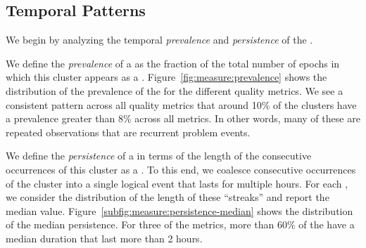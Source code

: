\subsection{Temporal Patterns}
\label{subsec:measurement:video:temporal}

We begin by analyzing the temporal \emph{prevalence} and 
\emph{persistence} of the \problemclusters.

We define the \emph{prevalence} of a \problemcluster as the 
fraction of the total number of epochs in which this cluster 
appears as a \problemcluster.  
Figure~\ref{fig:measure:prevalence} shows the distribution of 
the prevalence of the \problemclusters for the different
quality metrics. We see a consistent pattern  across all quality 
metrics that around 10\% of the clusters have a prevalence 
greater than 8\% across all metrics. 
In other words, many of these \problemclusters are repeated 
observations that are recurrent problem events. 

We define the \emph{persistence} of a \problemcluster in terms 
of the length of the consecutive occurrences of this cluster as a
\problemcluster.  
To this end, we coalesce consecutive occurrences of the cluster 
into a single logical event that lasts for multiple hours. 
For each \problemcluster, we  consider the distribution of the 
length of these ``streaks'' and report the median value.
Figure~\ref{subfig:measure:persistence-median} shows 
the distribution of the median persistence. 
For three of the metrics, more than 60\% of the \problemclusters 
have a median duration that last more than 2 hours.




